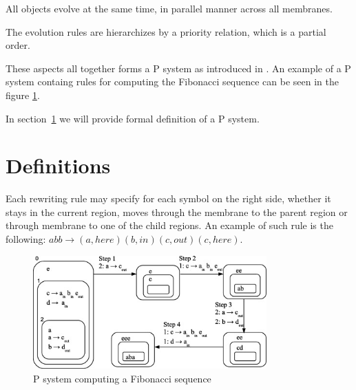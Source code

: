\documentclass[12pt,oneside,openany,pagenumber=footcenter]{book}
\begin{document}
All objects evolve at the same time, in parallel manner across all membranes.


The evolution rules are hierarchizes by a priority relation, which is a partial order.


These aspects all together forms a P system as introduced in \cite{Paun98}. An example of a P system containg rules for computing the Fibonacci sequence can be seen in the figure \ref{fig:p_system_fibonacci}.


In section~\ref{sec:definitions} we will provide formal definition of a P system.

\section{Definitions} %
\label{sec:definitions}




Each rewriting rule may specify for each symbol on the right side, whether it stays in the current region, moves through the membrane to the parent region or through membrane to one of the child regions. An example of such rule is the following: $abb\rightarrow (a,here)(b,in)(c,out)(c,here)$.










\begin{figure}[h]
  \centering
  \includegraphics[width=0.8\textwidth]{img/p_system_fibonacci.jpg}
  \caption{P system computing a Fibonacci sequence \cite{Buiu201233PSystemFibonacci}}
  \label{fig:p_system_fibonacci}
\end{figure}
\end{document}
